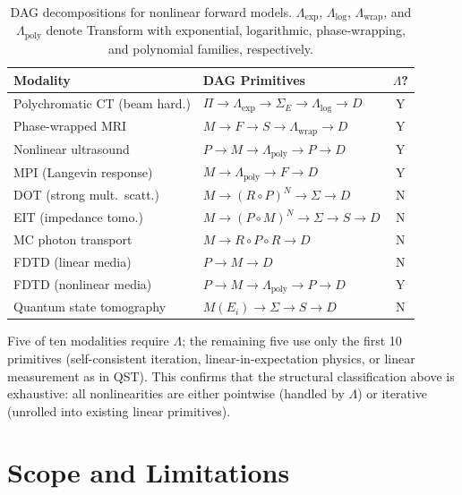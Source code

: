 \documentclass[11pt]{article}
\begin{document}
\begin{table}[htbp]
\centering
\caption{DAG decompositions for nonlinear forward models. $\Lambda_{\exp}$, $\Lambda_{\log}$, $\Lambda_{\mathrm{wrap}}$, and $\Lambda_{\mathrm{poly}}$ denote Transform with exponential, logarithmic, phase-wrapping, and polynomial families, respectively.}
\label{tab:nonlinear}
\begin{tabular}{l l c}
\toprule
\textbf{Modality} & \textbf{DAG Primitives} & \textbf{$\Lambda$?} \\
\midrule
Polychromatic CT (beam hard.)  & $\Pi \to \Lambda_{\exp} \to \Sigma_E \to \Lambda_{\log} \to D$ & Y \\
Phase-wrapped MRI              & $M \to F \to S \to \Lambda_{\mathrm{wrap}} \to D$ & Y \\
Nonlinear ultrasound           & $P \to M \to \Lambda_{\mathrm{poly}} \to P \to D$ & Y \\
MPI (Langevin response)        & $M \to \Lambda_{\mathrm{poly}} \to F \to D$ & Y \\
DOT (strong mult.\ scatt.)    & $M \to (R \circ P)^N \to \Sigma \to D$ & N \\
EIT (impedance tomo.)          & $M \to (P \circ M)^N \to \Sigma \to S \to D$ & N \\
MC photon transport             & $M \to R \circ P \circ R \to D$ & N \\
FDTD (linear media)            & $P \to M \to D$ & N \\
FDTD (nonlinear media)         & $P \to M \to \Lambda_{\mathrm{poly}} \to P \to D$ & Y \\
Quantum state tomography        & $M(E_i) \to \Sigma \to S \to D$ & N \\
\bottomrule
\end{tabular}
\end{table}

Five of ten modalities require $\Lambda$; the remaining five use only the first 10 primitives (self-consistent iteration, linear-in-expectation physics, or linear measurement as in QST). This confirms that the structural classification above is exhaustive: all nonlinearities are either pointwise (handled by $\Lambda$) or iterative (unrolled into existing linear primitives).


\section{Scope and Limitations}
\label{sec:scope}
\end{document}
